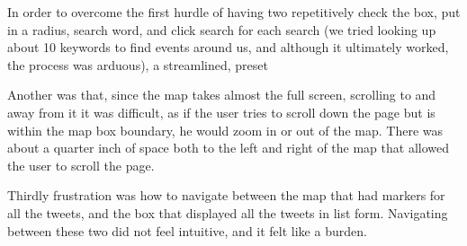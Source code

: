 \documentclass[11pt]{article}
\begin{document}
In order to overcome the first hurdle of having two repetitively check the box, put in a radius, search word, and click search for each search (we tried looking up about 10 keywords to find events around us, and although it ultimately worked, the process was arduous), a streamlined, preset 

Another was that, since the map takes almost the full screen, scrolling to and away from it it was difficult, as if the user tries to scroll down the page but is within the map box boundary, he would zoom in or out of the map. There was about a quarter inch of space both to the left and right of the map that allowed the user to scroll the page. 



Thirdly frustration was how to navigate between the map that had markers for all the tweets, and the box that displayed all the tweets in list form. Navigating between these two did not feel intuitive, and it felt like a burden.




\end{document}
